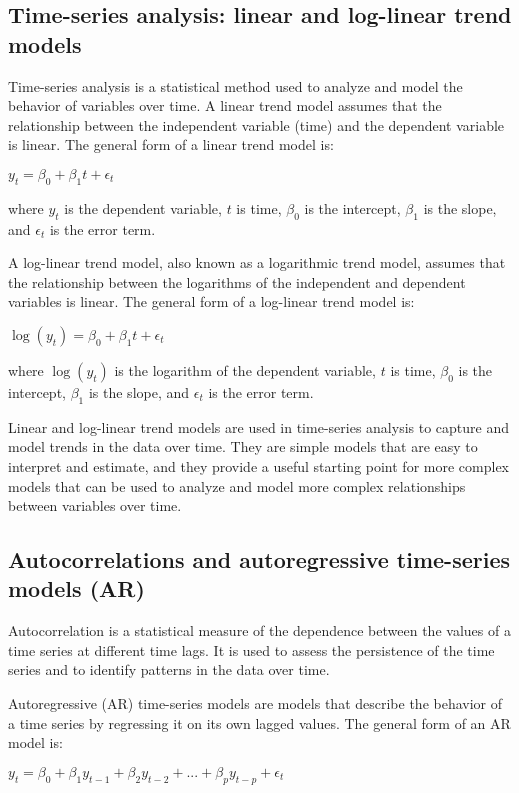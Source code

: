 \documentclass[12pt, a4paper, oneside]{article}
\begin{document}
\subsection{ Time-series analysis: linear and log-linear trend models }
Time-series analysis is a statistical method used to analyze and model the behavior of variables over time. A linear trend model assumes that the relationship between the independent variable (time) and the dependent variable is linear. The general form of a linear trend model is:

$y_t = \beta_0 + \beta_1 t + \epsilon_t$

where $y_t$ is the dependent variable, $t$ is time, $\beta_0$ is the intercept, $\beta_1$ is the slope, and $\epsilon_t$ is the error term.

A log-linear trend model, also known as a logarithmic trend model, assumes that the relationship between the logarithms of the independent and dependent variables is linear. The general form of a log-linear trend model is:

$\log(y_t) = \beta_0 + \beta_1 t + \epsilon_t$

where $\log(y_t)$ is the logarithm of the dependent variable, $t$ is time, $\beta_0$ is the intercept, $\beta_1$ is the slope, and $\epsilon_t$ is the error term.

Linear and log-linear trend models are used in time-series analysis to capture and model trends in the data over time. They are simple models that are easy to interpret and estimate, and they provide a useful starting point for more complex models that can be used to analyze and model more complex relationships between variables over time.

\subsection{ Autocorrelations and autoregressive time-series models (AR) }
Autocorrelation is a statistical measure of the dependence between the values of a time series at different time lags. It is used to assess the persistence of the time series and to identify patterns in the data over time.

Autoregressive (AR) time-series models are models that describe the behavior of a time series by regressing it on its own lagged values. The general form of an AR model is:

$y_t = \beta_0 + \beta_1 y_{t-1} + \beta_2 y_{t-2} + ... + \beta_p y_{t-p} + \epsilon_t$
\end{document}
